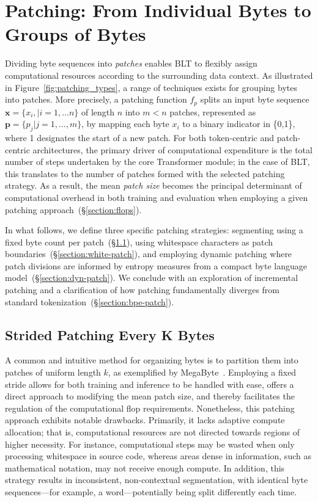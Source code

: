 \section{Patching: From Individual Bytes to Groups of Bytes}
\label{section:patching}

Dividing byte sequences into \textit{patches} enables {\textsc BLT} to flexibly assign computational resources according to the surrounding data context. As illustrated in Figure~\ref{fig:patching_types}, a range of techniques exists for grouping bytes into patches. More precisely, a patching function $f_p$ splits an input byte sequence $\pmb{x}=\{x_i,|i=1,\ldots n\}$ of length $n$ into $m < n$ patches, represented as $\pmb{p}=\{p_j|j=1,\ldots,m\}$, by mapping each byte $x_i$ to a binary indicator in \{0,1\}, where 1 designates the start of a new patch. For both token-centric and patch-centric architectures, the primary driver of computational expenditure is the total number of steps undertaken by the core Transformer module; in the case of {\textsc BLT}, this translates to the number of patches formed with the selected patching strategy. As a result, the mean \textit{patch size} becomes the principal determinant of computational overhead in both training and evaluation when employing a given patching approach~(\S\ref{section:flops}).

In what follows, we define three specific patching strategies: segmenting using a fixed byte count per patch~(\S\ref{section:static-patch}), using whitespace characters as patch boundaries~(\S\ref{section:white-patch}), and employing dynamic patching where patch divisions are informed by entropy measures from a compact byte language model~(\S\ref{section:dyn-patch}). We conclude with an exploration of incremental patching and a clarification of how patching fundamentally diverges from standard tokenization~(\S\ref{section:bpe-patch}).

\subsection{Strided Patching Every K Bytes}
\label{section:static-patch}

A common and intuitive method for organizing bytes is to partition them into patches of uniform length $k$, as exemplified by MegaByte~\citep{yu2023megabyte}. Employing a fixed stride allows for both training and inference to be handled with ease, offers a direct approach to modifying the mean patch size, and thereby facilitates the regulation of the computational flop requirements. Nonetheless, this patching approach exhibits notable drawbacks. Primarily, it lacks adaptive compute allocation; that is, computational resources are not directed towards regions of higher necessity. For instance, computational steps may be wasted when only processing whitespace in source code, whereas areas dense in information, such as mathematical notation, may not receive enough compute. In addition, this strategy results in inconsistent, non-contextual segmentation, with identical byte sequences—for example, a word—potentially being split differently each time.

